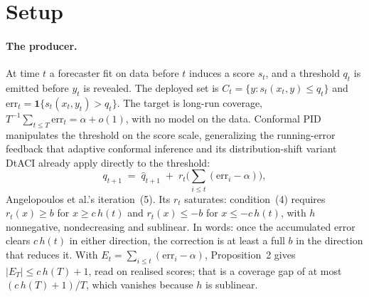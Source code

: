 \section{Setup}
\label{sec:setup}

\paragraph{The producer.} At time $t$ a forecaster fit on data before $t$ induces a score $s_t$,
and a threshold $q_t$ is emitted before $y_t$ is revealed. The deployed set is $C_t = \{y : s_t(x_t,y)
\le q_t\}$ and $\mathrm{err}_t = \mathbf{1}\{s_t(x_t,y_t) > q_t\}$. The target is long-run
coverage, $T^{-1}\sum_{t \le T}\mathrm{err}_t = \alpha + o(1)$, with no model on the data.
Conformal PID \citep{angelopoulos2023pid} manipulates the threshold on the score scale,
generalizing the running-error feedback that adaptive conformal inference
\citep{gibbs2021aci} and its distribution-shift variant DtACI \citep{gibbs2024dtaci} already
apply directly to the threshold:
\begin{equation}
  q_{t+1} \;=\; \hat{q}_{t+1} \;+\; r_t\Big(\textstyle\sum_{i \le t}(\mathrm{err}_i - \alpha)\Big),
  \label{eq:pid}
\end{equation}
Angelopoulos et al.'s iteration~(5). Its $r_t$ saturates: condition~(4) requires $r_t(x) \ge b$
for $x \ge c\,h(t)$ and $r_t(x) \le -b$ for $x \le -c\,h(t)$, with $h$ nonnegative, nondecreasing
and sublinear. In words: once the accumulated error clears $c\,h(t)$ in either direction, the
correction is at least a full $b$ in the direction that reduces it. With $E_t = \sum_{i
\le t}(\mathrm{err}_i-\alpha)$, Proposition~2 gives $|E_T| \le c\,h(T)+1$, read on realised
scores; that is a coverage gap of at most $(c\,h(T)+1)/T$, which vanishes because $h$ is
sublinear.

